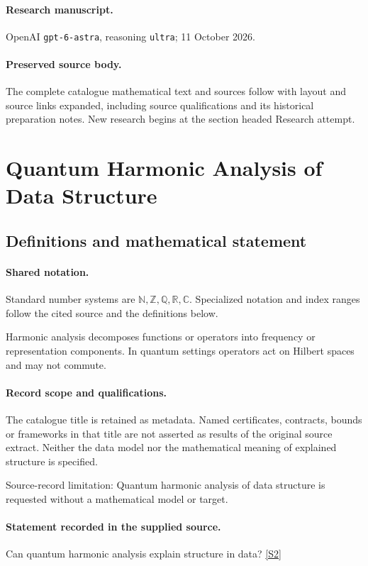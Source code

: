 \documentclass[11pt]{article}
\begin{document}
\paragraph{Research manuscript.} OpenAI \texttt{gpt-6-astra}, reasoning \texttt{ultra}; 11 October 2026.
\paragraph{Preserved source body.} The complete catalogue mathematical text and sources follow with layout and source links expanded, including source qualifications and its historical preparation notes. New research begins at the section headed Research attempt.

\section{Quantum Harmonic Analysis of Data Structure}\label{statement}

\subsection{Definitions and mathematical statement}

\paragraph{Shared notation.}Standard number systems are $\mathbb N,\mathbb Z,\mathbb Q,\mathbb R,\mathbb C$. Specialized notation and index ranges follow the cited source and the definitions below.


Harmonic analysis decomposes functions or operators into frequency or representation components. In quantum settings operators act on Hilbert spaces and may not commute.
\paragraph{Record scope and qualifications.}
The catalogue title is retained as metadata. Named certificates, contracts, bounds or frameworks in that title are not asserted as results of the original source extract.
Neither the data model nor the mathematical meaning of explained structure is specified.

Source-record limitation: Quantum harmonic analysis of data structure is requested without a mathematical model or target.
\paragraph{Statement recorded in the supplied source.}
Can quantum harmonic analysis explain structure in data? \href{https://doi.org/10.4171/owr/2024/21}{[S2]}
\end{document}

